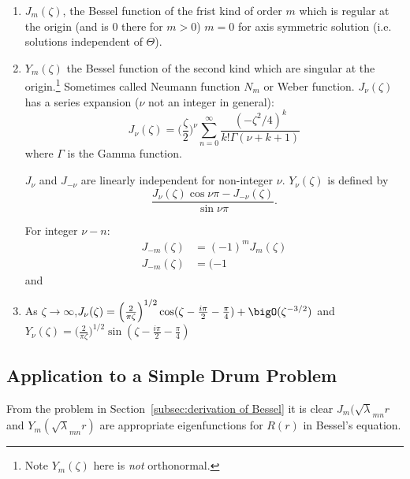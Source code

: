 \documentclass[a4paper]{article}
\begin{document}
\begin{enumerate}
\item \(J_m(\zeta)\), the Bessel function of the frist kind of order \(m\) which is regular at the origin (and is \(0\) there for \(m>0\)) \(m=0\) for axis symmetric solution (i.e. solutions independent of \(\Theta\)).
\item \(Y_m(\zeta)\) the Bessel function of the second kind which are singular at the origin.\footnote{Note \(Y_m(\zeta)\) here is \emph{not} orthonormal.} Sometimes called Neumann function \(N_m\) or Weber function.
  \(J_\nu(\zeta)\) has a series expansion (\(\nu\) not an integer in general):
  \[
    J_\nu(\zeta) = \Big( \frac{\zeta}{2} \Big)^\nu \sum_{n=0}^{\infty} \frac{(-\zeta^2/4)^k}{k!\Gamma(\nu+k+1)}
  \]
  where \(\Gamma\) is the Gamma function.

  \(J_\nu\) and \(J_{-\nu}\) are linearly independent for non-integer \(\nu\). \(Y_\nu(\zeta)\) is defined by
  \[
    \frac{J_\nu(\zeta)\cos\nu\pi - J_{-\nu}(\zeta)}{\sin\nu\pi}.
  \]

  For integer \(\nu-n\):
  \begin{align*}
    J_{-m}(\zeta) &= (-1)^m J_m(\zeta) \\
    J_{-m}(\zeta) &= (-1
  \end{align*}
  and
  \iffalse
  \begin{align*}
    Y_0(\zeta) &\approx \Big( \frac{2}{\pi} \Big) \log \zeta, \, J_0\approx 1 \text{ as } \zeta\to 0 \\
    Y_m(\zeta) &\approx - \frac{1}{\pi} \Big \frac{2}{\pi} \Big)
  \end{align*}
  \fi

\item As \(\zeta\to \infty\),\(J_\nu(\zeta) = \Big( \frac{2}{\pi\zeta} \Big)^{1/2} \cos(\zeta - \frac{i\pi}{2} - \frac{\pi}{4} ) + \bigO(\zeta^{-3/2})\) and \(Y_\nu(\zeta) = \Big( \frac{2}{\pi\zeta} \Big)^{1/2} \sin(\zeta - \frac{i\pi}{2} - \frac{\pi}{4} )\)
\end{enumerate}

\subsection{Application to a Simple Drum Problem}

From the problem in Section~\ref{subsec:derivation of Bessel} it is clear \(J_m(\sqrt\lambda_{mn}r\) and \(Y_m(\sqrt\lambda_{mn}r)\) are appropriate eigenfunctions for \(R(r)\) in Bessel's equation.
\end{document}
